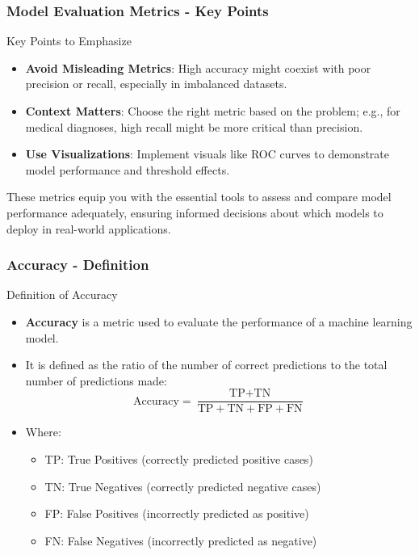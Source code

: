 \documentclass[aspectratio=169]{beamer}
\begin{document}
\begin{frame}[fragile]
    \frametitle{Model Evaluation Metrics - Key Points}
    \begin{block}{Key Points to Emphasize}
        \begin{itemize}
            \item \textbf{Avoid Misleading Metrics}: High accuracy might coexist with poor precision or recall, especially in imbalanced datasets.
            \item \textbf{Context Matters}: Choose the right metric based on the problem; e.g., for medical diagnoses, high recall might be more critical than precision.
            \item \textbf{Use Visualizations}: Implement visuals like ROC curves to demonstrate model performance and threshold effects.
        \end{itemize}
    \end{block}
    These metrics equip you with the essential tools to assess and compare model performance adequately, ensuring informed decisions about which models to deploy in real-world applications.
\end{frame}

\begin{frame}[fragile]
    \frametitle{Accuracy - Definition}
    \begin{block}{Definition of Accuracy}
        \begin{itemize}
            \item \textbf{Accuracy} is a metric used to evaluate the performance of a machine learning model.
            \item It is defined as the ratio of the number of correct predictions to the total number of predictions made:
            \begin{equation}
                \text{Accuracy} = \frac{\text{TP} + \text{TN}}{\text{TP} + \text{TN} + \text{FP} + \text{FN}}
            \end{equation}
            \item Where:
            \begin{itemize}
                \item TP: True Positives (correctly predicted positive cases)
                \item TN: True Negatives (correctly predicted negative cases)
                \item FP: False Positives (incorrectly predicted as positive)
                \item FN: False Negatives (incorrectly predicted as negative)
            \end{itemize}
        \end{itemize}
    \end{block}
\end{frame}
\end{document}
